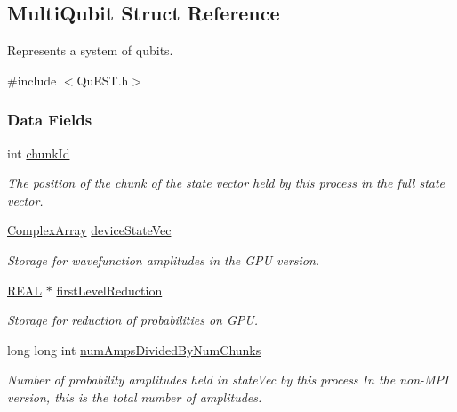 \hypertarget{structMultiQubit}{}\subsection{Multi\+Qubit Struct Reference}
\label{structMultiQubit}


Represents a system of qubits.  




{\ttfamily \#include $<$Qu\+E\+S\+T.\+h$>$}

\subsubsection*{Data Fields}
\begin{DoxyCompactItemize}
\item 
int \mbox{\hyperlink{structMultiQubit_ab10c88249fa3825d6227ceec01d37e37}{chunk\+Id}}
\begin{DoxyCompactList}\small\item\em The position of the chunk of the state vector held by this process in the full state vector. \end{DoxyCompactList}\item 
\mbox{\hyperlink{structComplexArray}{Complex\+Array}} \mbox{\hyperlink{structMultiQubit_a59ac613486a41b8c9a4b6e79cc8d2cc3}{device\+State\+Vec}}
\begin{DoxyCompactList}\small\item\em Storage for wavefunction amplitudes in the G\+PU version. \end{DoxyCompactList}\item 
\mbox{\hyperlink{QuEST__precision_8h_a4b654506f18b8bfd61ad2a29a7e38c25}{R\+E\+AL}} $\ast$ \mbox{\hyperlink{structMultiQubit_a4e0088b41adab0a40b7a31e528ed42b5}{first\+Level\+Reduction}}
\begin{DoxyCompactList}\small\item\em Storage for reduction of probabilities on G\+PU. \end{DoxyCompactList}\item 
long long int \mbox{\hyperlink{structMultiQubit_a04c9f5254af58e4c4a54712eb32e7082}{num\+Amps\+Divided\+By\+Num\+Chunks}}
\begin{DoxyCompactList}\small\item\em Number of probability amplitudes held in state\+Vec by this process In the non-\/\+M\+PI version, this is the total number of amplitudes. \end{DoxyCompactList}\item 

\end{DoxyCompactItemize}
